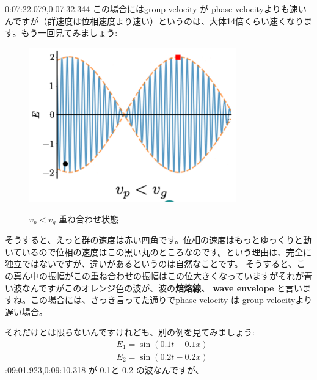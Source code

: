 0:07:22.079,0:07:32.344
\fi
この場合にはgroup velocity が phase velocityよりも速いんですが（群速度は位相速度より速い）というのは、大体14倍くらい速くなります。もう一回見てみましょう:
\begin{figure}[H]
   \centering
    \includegraphics[width=0.8\textwidth]{lesson6/vp_less_vg.pdf}
    \label{fig: 1}
    \begin{center}
        \caption{$v_p < v_g$ 重ね合わせ状態}
    \end{center}
\end{figure}

そうすると、えっと群の速度は赤い四角です。位相の速度はもっとゆっくりと動いているので位相の速度はこの黒い丸のところなのです。という理由は、完全に独立ではないですが、違いがあるというのは自然なことです。
そうすると、この真ん中の振幅がこの重ね合わせの振幅はこの位大きくなっていますがそれが青い波なんですがこのオレンジ色の波が、波の\textbf{焙烙線、
wave envelope} と言いますね。この場合には、さっき言ってた通りでphase velocity は group velocityより遅い場合。

それだけとは限らないんですけれども、別の例を見てみましょう:
\begin{equation}
\begin{aligned}
&E_{1}=\sin (0.1 t-0.1 x) \\
&E_{2}=\sin (0.2 t-0.2 x)
\end{aligned}
\end{equation}
:09:01.923,0:09:10.318
\omega が 0.1と 0.2 の波なんですが、

